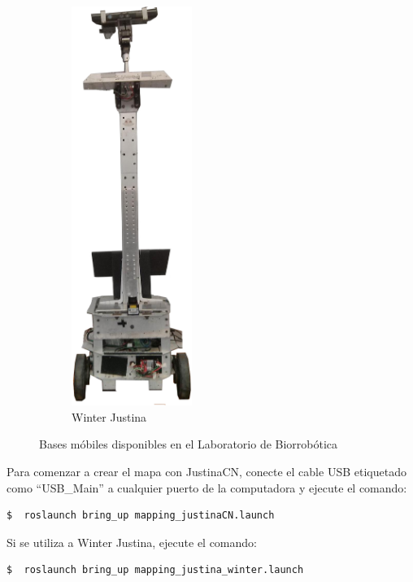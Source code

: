 \documentclass[letterpaper,12pt]{article}
\begin{document}
\begin{figure}
\begin{subfigure}{0.45\textwidth}
  \includegraphics[width=0.43\textwidth]{Figures/JustinaWinter.jpg}
  \caption{Winter Justina}
  \label{fig:JustinaWinter}
\end{subfigure}
\caption{Bases móbiles disponibles en el Laboratorio de Biorrobótica}
\end{figure}

Para comenzar a crear el mapa con JustinaCN, conecte el cable USB etiquetado como ``USB\_Main'' a cualquier puerto de la computadora y ejecute el comando:
\begin{verbatim}
$  roslaunch bring_up mapping_justinaCN.launch
\end{verbatim}

Si se utiliza a Winter Justina, ejecute el comando:
\begin{verbatim}
$  roslaunch bring_up mapping_justina_winter.launch
\end{verbatim}
\end{document}
